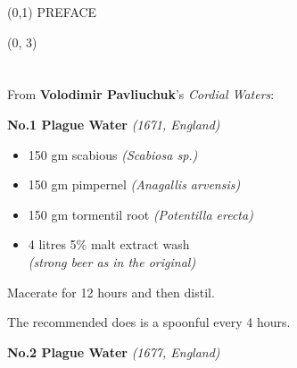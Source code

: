 \documentclass{article}
\begin{document}
\scriptsize

\begin{textblock}{23}(0,1)
\center\huge PREFACE
\end{textblock}

\begin{textblock}{11}(0, 3)

\section{}

    From \textbf{Volodimir Pavliuchuk}'s \emph{Cordial Waters}:

    \textbf{No.1 Plague Water} \emph{(1671, England)}

    \vspace{-\topsep}
    \begin{itemize}
        \renewcommand{\labelitemi}{$\circ$}
        \item 150 gm scabious \emph{(Scabiosa sp.)}
        \item 150 gm pimpernel \emph{(Anagallis arvensis)}
        \item 150 gm tormentil root \emph{(Potentilla erecta)}
        \item 4 litres 5\% malt extract wash\\
            [0.4\baselineskip]
            \emph{(strong beer as in the original)}
    \end{itemize}
    \vspace{-\topsep}

    Macerate for 12 hours and then distil.

    The recommended does is a spoonful every 4 hours.

    \textbf{No.2 Plague Water} \emph{(1677, England)}


\end{textblock}
\end{document}
